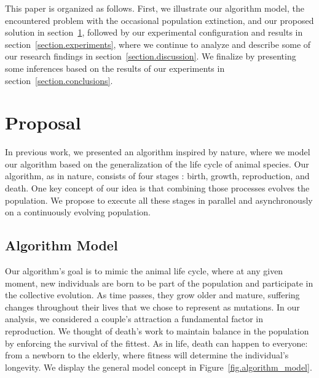 \documentclass[graybox]{svmult}
\begin{document}
    This paper is organized as follows. First, we 
    illustrate our algorithm model, the encountered problem with the occasional
    population extinction, and our proposed solution in
    section~\ref{section.proposal}, followed by our experimental configuration and
    results in section~\ref{section.experiments}, where we continue to analyze and
    describe some of our research findings in section~\ref{section.discussion}. We
    finalize by presenting some inferences based on the results of our experiments
    in section~\ref{section.conclusions}.

\section{Proposal}
    \label{section.proposal}

    In previous work, we presented an algorithm inspired by nature, where we %
    model our algorithm based on
    the generalization of the life cycle of animal species. Our algorithm, as
    in nature, consists of four stages \cite{read1968system}: birth, growth,
    reproduction, and death. One key concept of our idea is that combining
    those processes evolves the population. We propose to execute all these
    stages in parallel and asynchronously on a continuously evolving
    population.


    \subsection{Algorithm Model}
        

        Our algorithm's goal is to mimic the animal life cycle, where at any
        given moment, new individuals are born to be part of the population and
        participate in the collective evolution. As time passes, they grow
        older and mature, suffering changes throughout their lives that we
        chose to represent as mutations. In our analysis, we considered a
        couple's attraction a fundamental factor in reproduction. We thought of
        death's work to maintain balance in the population by enforcing the
        survival of the fittest. As in life, death can happen to everyone: from
        a newborn to the elderly, where fitness will determine the individual's
        longevity. We display the general model concept in
        Figure~\ref{fig.algorithm_model}.
\end{document}
